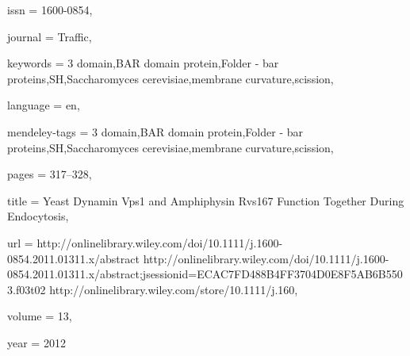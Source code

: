 {issn = {1600-0854},

journal = {Traffic},

keywords = {3 domain,BAR domain protein,Folder - bar proteins,SH,Saccharomyces cerevisiae,membrane curvature,scission},

language = {en},

mendeley-tags = {3 domain,BAR domain protein,Folder - bar proteins,SH,Saccharomyces cerevisiae,membrane curvature,scission},

pages = {317--328},

title = {{Yeast Dynamin Vps1 and Amphiphysin Rvs167 Function Together During Endocytosis}},

url = {http://onlinelibrary.wiley.com/doi/10.1111/j.1600-0854.2011.01311.x/abstract http://onlinelibrary.wiley.com/doi/10.1111/j.1600-0854.2011.01311.x/abstract;jsessionid=ECAC7FD488B4FF3704D0E8F5AB6B5503.f03t02 http://onlinelibrary.wiley.com/store/10.1111/j.160},

volume = {13},

year = {2012}

}

